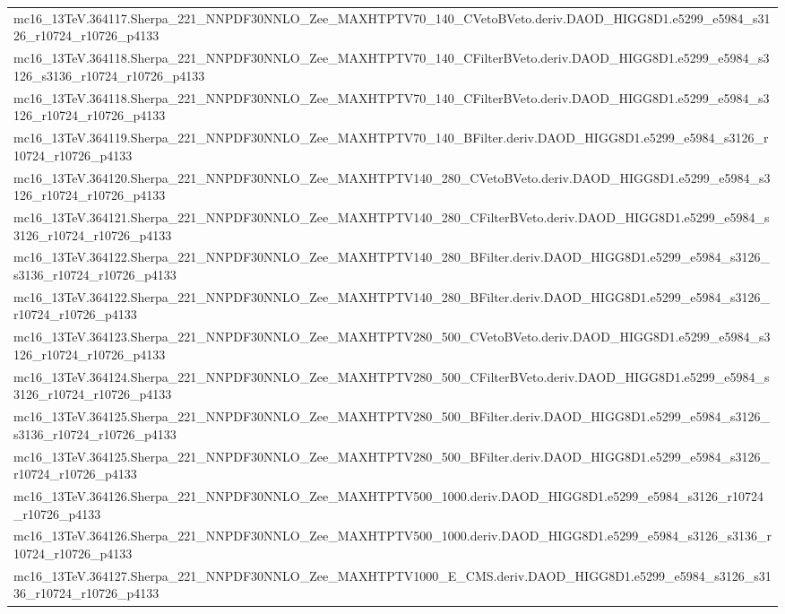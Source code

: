 \begin{adjustwidth}{-3em}{-3em}
\begin{longtable}{l}
mc16\_13TeV.364117.Sherpa\_221\_NNPDF30NNLO\_Zee\_MAXHTPTV70\_140\_CVetoBVeto.deriv.DAOD\_HIGG8D1.e5299\_e5984\_s3126\_r10724\_r10726\_p4133 \\
mc16\_13TeV.364118.Sherpa\_221\_NNPDF30NNLO\_Zee\_MAXHTPTV70\_140\_CFilterBVeto.deriv.DAOD\_HIGG8D1.e5299\_e5984\_s3126\_s3136\_r10724\_r10726\_p4133 \\
mc16\_13TeV.364118.Sherpa\_221\_NNPDF30NNLO\_Zee\_MAXHTPTV70\_140\_CFilterBVeto.deriv.DAOD\_HIGG8D1.e5299\_e5984\_s3126\_r10724\_r10726\_p4133 \\
mc16\_13TeV.364119.Sherpa\_221\_NNPDF30NNLO\_Zee\_MAXHTPTV70\_140\_BFilter.deriv.DAOD\_HIGG8D1.e5299\_e5984\_s3126\_r10724\_r10726\_p4133 \\
mc16\_13TeV.364120.Sherpa\_221\_NNPDF30NNLO\_Zee\_MAXHTPTV140\_280\_CVetoBVeto.deriv.DAOD\_HIGG8D1.e5299\_e5984\_s3126\_r10724\_r10726\_p4133 \\
mc16\_13TeV.364121.Sherpa\_221\_NNPDF30NNLO\_Zee\_MAXHTPTV140\_280\_CFilterBVeto.deriv.DAOD\_HIGG8D1.e5299\_e5984\_s3126\_r10724\_r10726\_p4133 \\
mc16\_13TeV.364122.Sherpa\_221\_NNPDF30NNLO\_Zee\_MAXHTPTV140\_280\_BFilter.deriv.DAOD\_HIGG8D1.e5299\_e5984\_s3126\_s3136\_r10724\_r10726\_p4133 \\
mc16\_13TeV.364122.Sherpa\_221\_NNPDF30NNLO\_Zee\_MAXHTPTV140\_280\_BFilter.deriv.DAOD\_HIGG8D1.e5299\_e5984\_s3126\_r10724\_r10726\_p4133 \\
mc16\_13TeV.364123.Sherpa\_221\_NNPDF30NNLO\_Zee\_MAXHTPTV280\_500\_CVetoBVeto.deriv.DAOD\_HIGG8D1.e5299\_e5984\_s3126\_r10724\_r10726\_p4133 \\
mc16\_13TeV.364124.Sherpa\_221\_NNPDF30NNLO\_Zee\_MAXHTPTV280\_500\_CFilterBVeto.deriv.DAOD\_HIGG8D1.e5299\_e5984\_s3126\_r10724\_r10726\_p4133 \\
mc16\_13TeV.364125.Sherpa\_221\_NNPDF30NNLO\_Zee\_MAXHTPTV280\_500\_BFilter.deriv.DAOD\_HIGG8D1.e5299\_e5984\_s3126\_s3136\_r10724\_r10726\_p4133 \\
mc16\_13TeV.364125.Sherpa\_221\_NNPDF30NNLO\_Zee\_MAXHTPTV280\_500\_BFilter.deriv.DAOD\_HIGG8D1.e5299\_e5984\_s3126\_r10724\_r10726\_p4133 \\
mc16\_13TeV.364126.Sherpa\_221\_NNPDF30NNLO\_Zee\_MAXHTPTV500\_1000.deriv.DAOD\_HIGG8D1.e5299\_e5984\_s3126\_r10724\_r10726\_p4133 \\
mc16\_13TeV.364126.Sherpa\_221\_NNPDF30NNLO\_Zee\_MAXHTPTV500\_1000.deriv.DAOD\_HIGG8D1.e5299\_e5984\_s3126\_s3136\_r10724\_r10726\_p4133 \\
mc16\_13TeV.364127.Sherpa\_221\_NNPDF30NNLO\_Zee\_MAXHTPTV1000\_E\_CMS.deriv.DAOD\_HIGG8D1.e5299\_e5984\_s3126\_s3136\_r10724\_r10726\_p4133 \\

\end{longtable}
\end{adjustwidth}
